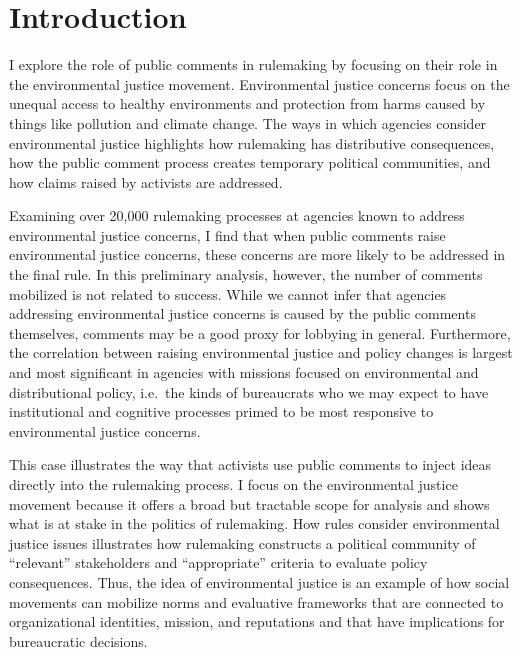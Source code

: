 \documentclass[
      12pt,
        ]{article}
\begin{document}


  \newpage

\noindent 
 
   
   
\hypertarget{introduction}{%
\section{Introduction}\label{introduction}}

I explore the role of public comments in rulemaking by focusing on their
role in the environmental justice movement. Environmental justice
concerns focus on the unequal access to healthy environments and
protection from harms caused by things like pollution and climate
change. The ways in which agencies consider environmental justice
highlights how rulemaking has distributive consequences, how the public
comment process creates temporary political communities, and how claims
raised by activists are addressed.

Examining over 20,000 rulemaking processes at agencies known to address
environmental justice concerns, I find that when public comments raise
environmental justice concerns, these concerns are more likely to be
addressed in the final rule. In this preliminary analysis, however, the
number of comments mobilized is not related to success. While we cannot
infer that agencies addressing environmental justice concerns is caused
by the public comments themselves, comments may be a good proxy for
lobbying in general. Furthermore, the correlation between raising
environmental justice and policy changes is largest and most significant
in agencies with missions focused on environmental and distributional
policy, i.e.~the kinds of bureaucrats who we may expect to have
institutional and cognitive processes primed to be most responsive to
environmental justice concerns.

This case illustrates the way that activists use public comments to
inject ideas directly into the rulemaking process. I focus on the
environmental justice movement because it offers a broad but tractable
scope for analysis and shows what is at stake in the politics of
rulemaking. How rules consider environmental justice issues illustrates
how rulemaking constructs a political community of ``relevant''
stakeholders and ``appropriate'' criteria to evaluate policy consequences.
Thus, the idea of environmental justice is an example of how social
movements can mobilize norms and evaluative frameworks that are
connected to organizational identities, mission, and reputations and
that have implications for bureaucratic decisions.
\end{document}
